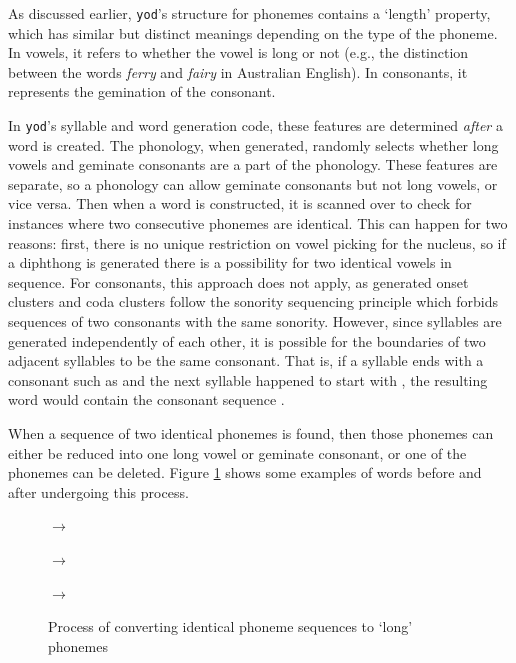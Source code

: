 \documentclass{report}
\begin{document}
	As discussed earlier, \texttt{yod}'s structure for phonemes contains a `length' property, which has similar but distinct meanings depending on the type of the phoneme. In vowels, it refers to whether the vowel is long or not (e.g., the distinction between the words \textit{ferry}  and \textit{fairy}  in Australian English). In consonants, it represents the gemination of the consonant.
	
	In \texttt{yod}'s syllable and word generation code, these features are determined \textit{after} a word is created. The phonology, when generated, randomly selects whether long vowels and geminate consonants are a part of the phonology. These features are separate, so a phonology can allow geminate consonants but not long vowels, or vice versa. Then when a word is constructed, it is scanned over to check for instances where two consecutive phonemes are identical. This can happen for two reasons: first, there is no unique restriction on vowel picking for the nucleus, so if a diphthong is generated there is a possibility for two identical vowels in sequence. For consonants, this approach does not apply, as generated onset clusters and coda clusters follow the sonority sequencing principle which forbids sequences of two consonants with the same sonority. However, since syllables are generated independently of each other, it is possible for the boundaries of two adjacent syllables to be the same consonant. That is, if a syllable ends with a consonant such as  and the next syllable happened to start with , the resulting word would contain the consonant sequence .
	
	When a sequence of two identical phonemes is found, then those phonemes can either be reduced into one long vowel or geminate consonant, or one of the phonemes can be deleted. Figure \ref{convert to long phonemes examples} shows some examples of words before and after undergoing this process.
	
	\begin{figure}[h]
		\caption{Process of converting identical phoneme sequences to `long' phonemes}
		\label{convert to long phonemes examples}
		\begin{tcolorbox}
			\begin{Large}
				 $\rightarrow$ 
				
				 $\rightarrow$ 
				
				 $\rightarrow$ 
			\end{Large}
		\end{tcolorbox}
	\end{figure}
\end{document}
